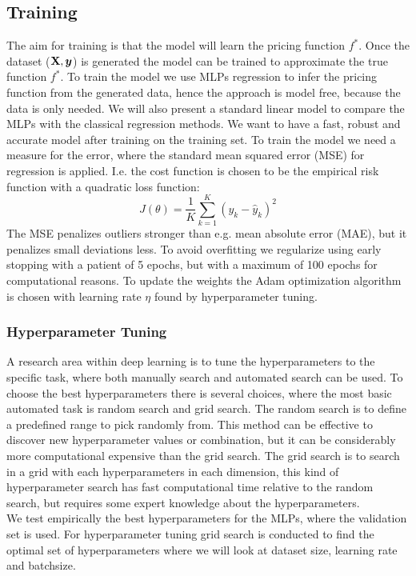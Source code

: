 \subsection{Training}\label{Training}
The aim for training is that the model will learn the pricing function $f^*$. Once the dataset ($\mathbf{X}, \bm{y}$) is generated the model can be trained to approximate the true function $f^*$. To train the model we use MLPs regression to infer the pricing function from the generated data, hence the approach is model free, because the data is only needed. We will also present a standard linear model to compare the MLPs with the classical regression methods. We want to have a fast, robust and accurate model after training on the training set. To train the model we need a measure for the error, where the standard mean squared error (MSE) for regression is applied. I.e. the cost function is chosen to be the empirical risk function with a quadratic loss function:
$$J(\theta)= \frac{1}{K} \sum_{k=1}^{K}(y_k-\hat{y}_k)^2$$
The MSE penalizes outliers stronger than e.g. mean absolute error (MAE), but it penalizes small deviations less. To avoid overfitting we regularize using early stopping with a patient of 5 epochs, but with a maximum of 100 epochs for computational reasons. To update the weights the Adam optimization algorithm is chosen with learning rate $\eta$ found by hyperparameter tuning. \\

\subsubsection{Hyperparameter Tuning}
A research area within deep learning is to tune the hyperparameters to the specific task, where both manually search and automated search can be used. To choose the best hyperparameters there is several choices, where the most basic automated task is random search and grid search. The random search is to define a predefined range to pick randomly from. This method can be effective to discover new hyperparameter values or combination, but it can be considerably more computational expensive than the grid search. The grid search is to search in a grid with each hyperparameters in each dimension, this kind of hyperparameter search has fast computational time relative to the random search, but requires some expert knowledge about the hyperparameters.\\

We test empirically the best hyperparameters for the MLPs, where the validation set is used. For hyperparameter tuning grid search is conducted to find the optimal set of hyperparameters where we will look at dataset size, learning rate and batchsize. \\

